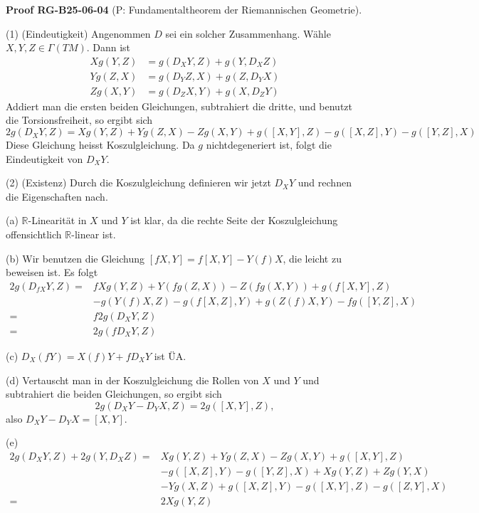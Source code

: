 \documentclass[10pt, letterpaper]{article}
\newcommand{\CustomHeading}[3]{%
  \par\medskip\noindent%
  \textbf{#1 #2} \textnormal{(#3)}.\enskip%
}
\newenvironment{PROOF}[2]{\begin{unitbox}\CustomHeading{Proof}{#1}{#2}}{\end{unitbox}}
\begin{document}
\begin{PROOF}{RG-B25-06-04}{P: Fundamentaltheorem der Riemannischen Geometrie}
(1) (Eindeutigkeit) Angenommen $D$ sei ein solcher Zusammenhang. Wähle $X, Y, Z \in \Gamma(T M)$. Dann ist
$$
\begin{aligned}
X g(Y, Z) & =g\left(D_{X} Y, Z\right)+g\left(Y, D_{X} Z\right) \\
Y g(Z, X) & =g\left(D_{Y} Z, X\right)+g\left(Z, D_{Y} X\right) \\
Z g(X, Y) & =g\left(D_{Z} X, Y\right)+g\left(X, D_{Z} Y\right)
\end{aligned}
$$
Addiert man die ersten beiden Gleichungen, subtrahiert die dritte, und benutzt die Torsionsfreiheit, so ergibt sich
$$2 g\left(D_{X} Y, Z\right)=X g(Y, Z)+Y g(Z, X)-Z g(X, Y)+g([X, Y], Z)-g([X, Z], Y)-g([Y, Z], X)$$
Diese Gleichung heisst Koszulgleichung. Da $g$ nichtdegeneriert ist, folgt die Eindeutigkeit von $D_{X} Y$.


(2) (Existenz) Durch die Koszulgleichung definieren wir jetzt $D_{X} Y$ und rechnen die Eigenschaften nach.

(a) $\mathbb{R}$-Linearität in $X$ und $Y$ ist klar, da die rechte Seite der Koszulgleichung offensichtlich $\mathbb{R}$-linear ist.

(b) Wir benutzen die Gleichung $[f X, Y]=f[X, Y]-Y(f) X$, die leicht zu beweisen ist. Es folgt
$$
\begin{aligned}
2 g\left(D_{f X} Y, Z\right)= & f X g(Y, Z)+Y(f g(Z, X))-Z(f g(X, Y))+g(f[X, Y], Z) \\
& -g(Y(f) X, Z)-g(f[X, Z], Y)+g(Z(f) X, Y)-f g([Y, Z], X) \\
= & f 2 g\left(D_{X} Y, Z\right) \\
= & 2 g\left(f D_{X} Y, Z\right)
\end{aligned}
$$

(c) $D_{X}(f Y)=X(f) Y+f D_{X} Y$ ist ÜA.

(d) Vertauscht man in der Koszulgleichung die Rollen von $X$ und $Y$ und subtrahiert die beiden Gleichungen, so ergibt sich
$$
2 g\left(D_{X} Y-D_{Y} X, Z\right)=2 g([X, Y], Z),
$$
also $D_{X} Y-D_{Y} X=[X, Y]$.

(e)
$$
\begin{aligned}
2 g\left(D_{X} Y, Z\right)+2 g\left(Y, D_{X} Z\right)= & X g(Y, Z)+Y g(Z, X)-Z g(X, Y)+g([X, Y], Z) \\
& -g([X, Z], Y)-g([Y, Z], X)+X g(Y, Z)+Z g(Y, X) \\
& -Y g(X, Z)+g([X, Z], Y)-g([X, Y], Z)-g([Z, Y], X) \\
= & 2 X g(Y, Z)
\end{aligned}
$$
\end{PROOF}
\end{document}
